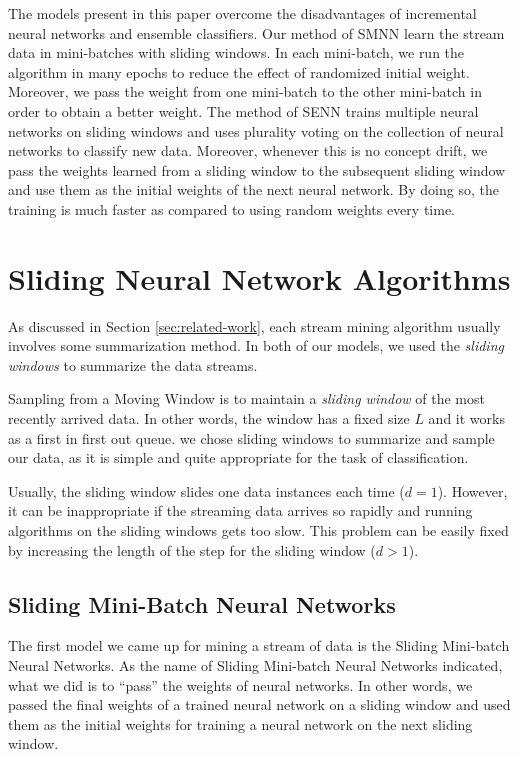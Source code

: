 \documentclass[conference]{IEEEtran}
\begin{document}
The models present in this paper overcome the disadvantages of incremental neural networks and ensemble classifiers.  Our method of SMNN learn the stream data in mini-batches with sliding windows. In each mini-batch, we run the algorithm in many epochs to reduce the effect of randomized initial weight. Moreover, we pass the weight from one mini-batch to the other mini-batch in order to obtain a better weight. The method of SENN trains multiple neural networks on sliding windows and uses plurality voting on the collection of neural networks to classify new data. Moreover, whenever this is no concept drift, we pass the weights learned from a sliding window to the subsequent sliding window and use them as the initial weights of the next neural network. By doing so, the training  is much faster as compared to using random weights every time. 

\section{Sliding Neural Network Algorithms} 
\label{sec:models}
As discussed in Section \ref{sec:related-work}, each stream mining algorithm usually involves some summarization method. In both of our models,  we used the \emph{sliding windows} to summarize the data streams.

Sampling from a Moving Window is to maintain a \emph{sliding window} of the most recently arrived data. In other words, the window has a fixed size $L$ and it works as a first in first out queue. we chose sliding windows to summarize and sample our data, as it is simple and quite appropriate for the task of classification. 

Usually, the sliding window slides one data instances each time ($d=1$). However, it can be inappropriate if the streaming data arrives so rapidly and running algorithms on the sliding windows gets too slow. This problem can be easily fixed by increasing the length of the step for the sliding window ($d>1$).  

\subsection{Sliding Mini-Batch Neural Networks}
The first model we came up for mining a stream of data is the Sliding Mini-batch Neural Networks. As the name of Sliding Mini-batch Neural Networks indicated, what we did is to ``pass'' the weights of neural networks. In other words, we passed the final weights of a trained neural network on a sliding window and used them as the initial weights for training a neural network on the next sliding window.
\end{document}

